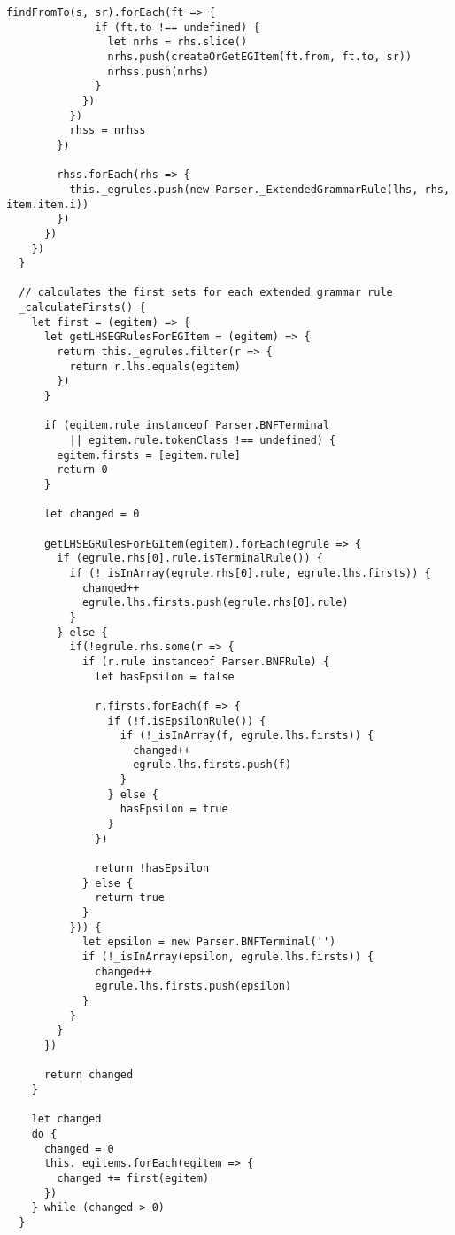 \begin{lstlisting}[frame=single]
            findFromTo(s, sr).forEach(ft => {
              if (ft.to !== undefined) {
                let nrhs = rhs.slice()
                nrhs.push(createOrGetEGItem(ft.from, ft.to, sr))
                nrhss.push(nrhs)
              }
            })
          })
          rhss = nrhss
        })
        
        rhss.forEach(rhs => {
          this._egrules.push(new Parser._ExtendedGrammarRule(lhs, rhs, item.item.i))
        })
      })
    })
  }
  
  // calculates the first sets for each extended grammar rule
  _calculateFirsts() {
    let first = (egitem) => {
      let getLHSEGRulesForEGItem = (egitem) => {
        return this._egrules.filter(r => { 
          return r.lhs.equals(egitem) 
        })
      }
      
      if (egitem.rule instanceof Parser.BNFTerminal
          || egitem.rule.tokenClass !== undefined) {
        egitem.firsts = [egitem.rule]
        return 0
      } 
      
      let changed = 0
      
      getLHSEGRulesForEGItem(egitem).forEach(egrule => {
        if (egrule.rhs[0].rule.isTerminalRule()) {
          if (!_isInArray(egrule.rhs[0].rule, egrule.lhs.firsts)) {
            changed++
            egrule.lhs.firsts.push(egrule.rhs[0].rule)
          }
        } else {
          if(!egrule.rhs.some(r => {
            if (r.rule instanceof Parser.BNFRule) {
              let hasEpsilon = false
              
              r.firsts.forEach(f => {
                if (!f.isEpsilonRule()) {
                  if (!_isInArray(f, egrule.lhs.firsts)) {
                    changed++
                    egrule.lhs.firsts.push(f)
                  }
                } else {
                  hasEpsilon = true
                }
              })
              
              return !hasEpsilon
            } else {
              return true
            }
          })) {
            let epsilon = new Parser.BNFTerminal('')
            if (!_isInArray(epsilon, egrule.lhs.firsts)) {
              changed++
              egrule.lhs.firsts.push(epsilon)
            }
          }
        }
      })
      
      return changed
    }
  
    let changed
    do {
      changed = 0
      this._egitems.forEach(egitem => {
        changed += first(egitem)
      })
    } while (changed > 0)
  }
  

\end{lstlisting}
